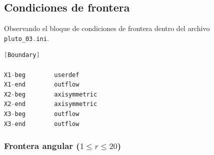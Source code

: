 \documentclass[11pt, letterpaper]{article}
\begin{document}
\subsection{Condiciones de frontera}

Observando el bloque de condiciones de frontera dentro del archivo \lstinline[language=C]{pluto_03.ini}.
\begin{lstlisting}[language=C, caption={Definiciones de condiciones de frontera (pluto\_03.init)}, label={lst:ini_boundary}]
[Boundary]

X1-beg        userdef
X1-end        outflow
X2-beg        axisymmetric
X2-end        axisymmetric
X3-beg        outflow
X3-end        outflow
\end{lstlisting}

\subsubsection{\texorpdfstring{Frontera angular ($1 \leq r \leq 20$)}
  {Frontera angular (1 <= r <= 20)}}
\end{document}
